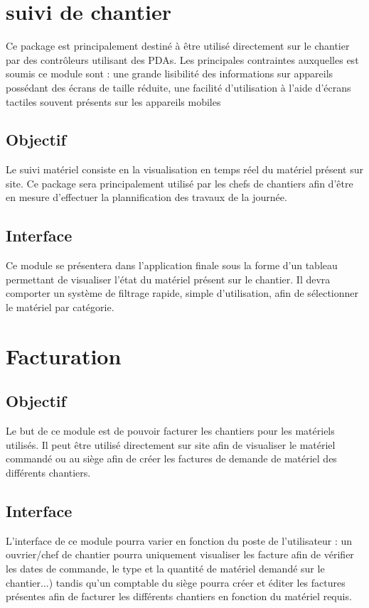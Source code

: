 
\section {suivi de chantier}

Ce package est principalement destiné à être utilisé directement sur le chantier par des contrôleurs utilisant des PDAs. Les principales contraintes auxquelles est soumis ce module sont : une grande lisibilité des informations sur appareils possédant des écrans de taille réduite, une facilité d'utilisation à l'aide d'écrans tactiles souvent présents sur les appareils mobiles

	\subsection {Objectif}
	Le suivi matériel consiste en la visualisation en temps réel du matériel présent sur site. Ce package sera principalement utilisé par les chefs de chantiers 		afin d'être en mesure d'effectuer la plannification des travaux de la journée. 

	\subsection {Interface}
	Ce module se présentera dans l'application finale sous la forme d'un tableau permettant de visualiser l'état du matériel présent sur le chantier. Il devra comporter un système de filtrage rapide, simple d'utilisation, afin de sélectionner le matériel par catégorie.



\section {Facturation}


	\subsection {Objectif}
	Le but de ce module est de pouvoir facturer les chantiers pour les matériels utilisés. Il peut être utilisé directement sur site afin de visualiser le matériel commandé ou au siège afin de créer les factures de demande de matériel des différents chantiers.

	\subsection {Interface}
	L'interface de ce module pourra varier en fonction du poste de l'utilisateur : un ouvrier/chef de chantier pourra uniquement visualiser les facture afin de vérifier les dates de commande, le type et la quantité de matériel demandé sur le chantier...) tandis qu'un comptable du siège pourra créer et éditer les factures présentes afin de facturer les différents chantiers en fonction du matériel requis.
